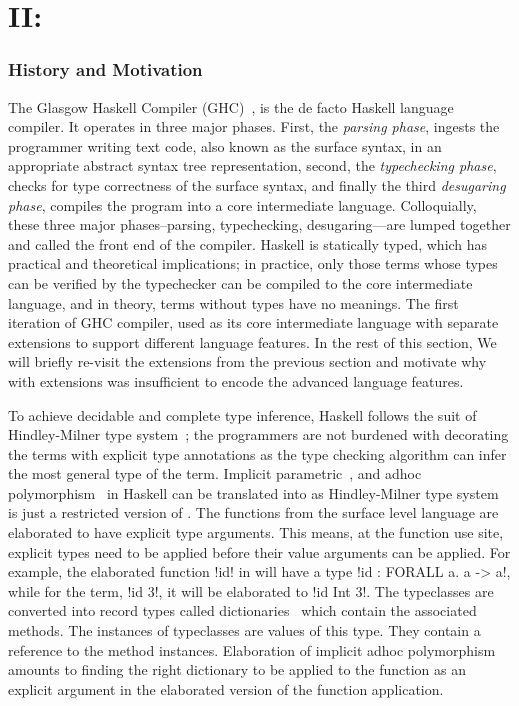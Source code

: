 \documentclass[screen,nonacm,manuscript,review]{acmart} %
\begin{document}
\part{II: \SFC}\label{part:II}
\section{History and Motivation}
The Glasgow Haskell Compiler (GHC)~\cite{ghc_2020}, is the de facto
Haskell language~\cite{haskell_2010} compiler. It operates in
three major phases. First, the \emph{parsing phase}, ingests the
programmer writing text code, also known as
the surface syntax, in an appropriate abstract syntax tree
representation, second, the \emph{typechecking phase},
checks for type correctness of the surface syntax, and finally the
third \emph{desugaring phase}, compiles the program into a core intermediate
language. Colloquially, these three major phases--parsing,
typechecking, desugaring---are lumped together and called
the front end of the compiler. Haskell is statically typed,
which has practical and theoretical implications;
in practice, only those terms whose types can be verified by the
typechecker can be compiled to the core intermediate language, and in theory,
terms without types have no meanings. The first iteration of GHC
compiler, used \SF as its core intermediate language with
separate extensions to support different language features. In the
rest of this section, We will briefly re-visit the extensions  from
the previous section and motivate why \SF with extensions was
insufficient to encode the advanced language features.

To achieve decidable and complete type inference, Haskell follows the suit
of Hindley-Milner type system~\cite{milner_theory_1978}; the
programmers are not burdened with decorating the terms with explicit
type annotations as the type checking algorithm can infer the most
general type of the term. Implicit parametric~\cite{reynolds_user-defined_1978}, and adhoc
polymorphism~\cite{hall_type_1994} in Haskell can be
translated into \SF as Hindley-Milner type system is just a restricted
version of \SF. The functions from the surface
level language are elaborated to have explicit type arguments. This
means, at the function use site, explicit types need to be applied
before their value arguments can be applied.
For example, the elaborated function !id! in \SF will have a type
!id : FORALL a. a -> a!, while for the term, !id 3!, it will be elaborated
to !id Int 3!. The typeclasses are converted into record types called
dictionaries~\cite{wadler_polymorphism_1989} which contain the
associated methods. The instances of typeclasses are
values of this type. They contain a reference to the method instances.
Elaboration of implicit adhoc polymorphism amounts to finding
the right dictionary to be applied to the function as an explicit
argument in the elaborated version of the function application.
\end{document}
